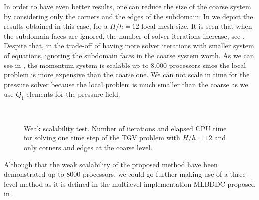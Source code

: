 In order to have even better results, one can reduce the size of the coarse system by considering only the corners and the edges of the subdomain. In  we depict the results obtained in this case, for a $ H/h=12 $ local mesh size. It is seen that when the subdomain faces are ignored, the number of solver iterations increase, see . Despite that, in the trade-off of having more solver iterations with smaller system of equations, ignoring the subdomain faces in the coarse system worth. As we can see in , the momentum system is scalable up to 8.000 processors since the local problem is more expensive than the coarse one. We can not scale in time for the pressure solver because the local problem is much smaller than the coarse as we use $ Q_1 $ elements for the pressure field.
\begin{figure}[h!]
  \centering
  \\
  \caption{Weak scalability test. Number of iterations and elapsed CPU time for solving one time step of the TGV problem with $ H/h=12 $ and only corners and edges at the coarse level.}
  \label{fig-TGV_SRK_scal_ce}
\end{figure}

Although that the weak scalability of the proposed method have been demonstrated up to 8000 processors, we could go further making use of a three-level method as it is defined in the multilevel implementation MLBDDC proposed in \cite{alberto_f._martin_santiago_badia_and_javier_principe_multilevel_????}.

